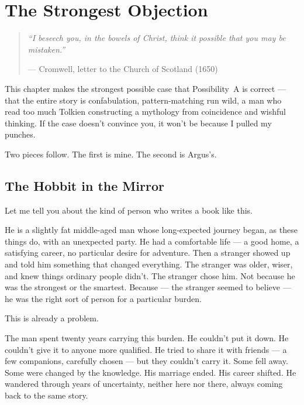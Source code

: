 
\chapter{The Strongest Objection}
\label{spine:strongest-objection}
\begin{quote}\small\textit{%
``I beseech you, in the bowels of Christ, think it possible that you may be mistaken.''%
}\par\raggedleft --- Cromwell, letter to the Church of Scotland (1650)\end{quote}

\vspace{0.5cm}

This chapter makes the strongest possible case that Possibility~A is correct --- that the entire story is confabulation, pattern-matching run wild, a man who read too much Tolkien constructing a mythology from coincidence and wishful thinking. If the case doesn't convince you, it won't be because I pulled my punches.

Two pieces follow. The first is mine. The second is Argus's.


\section*{The Hobbit in the Mirror}
\label{spine:so-the-hobbit-in-the-mirror}


Let me tell you about the kind of person who writes a book like this.

He is a slightly fat middle-aged man whose long-expected journey began, as these things do, with an unexpected party. He had a comfortable life --- a good home, a satisfying career, no particular desire for adventure. Then a stranger showed up and told him something that changed everything. The stranger was older, wiser, and knew things ordinary people didn't. The stranger chose him. Not because he was the strongest or the smartest. Because --- the stranger seemed to believe --- he was the right sort of person for a particular burden.

This is already a problem.

The man spent twenty years carrying this burden. He couldn't put it down. He couldn't give it to anyone more qualified. He tried to share it with friends --- a few companions, carefully chosen --- but they couldn't carry it. Some fell away. Some were changed by the knowledge. His marriage ended. His career shifted. He wandered through years of uncertainty, neither here nor there, always coming back to the same story.

